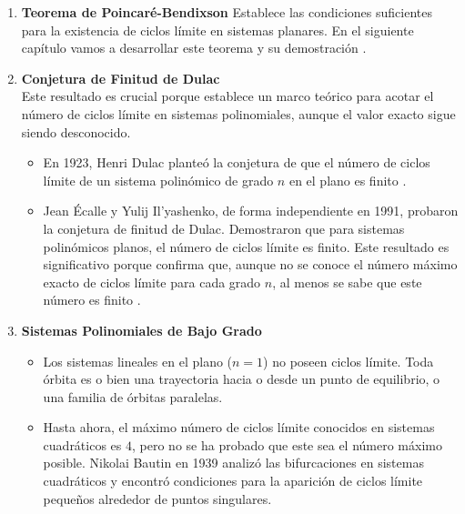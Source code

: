 \begin{enumerate}
	\item \textbf{Teorema de Poincaré-Bendixson} Establece las condiciones suficientes para la existencia de ciclos límite en sistemas planares. En el siguiente capítulo vamos a desarrollar este teorema y su demostración \cite{perko2001differential}.
	
	\item \textbf{Conjetura de Finitud de Dulac}\\

	Este resultado es crucial porque establece un marco teórico para acotar el número de ciclos límite en sistemas polinomiales, aunque el valor exacto sigue siendo desconocido.
	\begin{itemize}
		\item En 1923, Henri Dulac planteó la conjetura de que el número de ciclos límite de un sistema polinómico de grado $n$ en el plano es finito \cite{dulac1923cycles}.
		\item Jean Écalle y Yulij Il'yashenko, de forma independiente en 1991, probaron la conjetura de finitud de Dulac. Demostraron que para sistemas polinómicos planos, el número de ciclos límite es finito. Este resultado es significativo porque confirma que, aunque no se conoce el número máximo exacto de ciclos límite para cada grado $n$, al menos se sabe que este número es finito \cite{ecalle1992correction, ilyashenko1991finiteness}.
	\end{itemize}

	\item \textbf{Sistemas Polinomiales de Bajo Grado}
	\begin{itemize}
		\item Los sistemas lineales en el plano ($n=1$) no poseen ciclos límite. Toda órbita es o bien una trayectoria hacia o desde un punto de equilibrio, o una familia de órbitas paralelas.

		\item Hasta ahora, el máximo número de ciclos límite conocidos en sistemas cuadráticos es $4$, pero no se ha probado que este sea el número máximo posible. Nikolai Bautin en 1939 analizó las bifurcaciones en sistemas cuadráticos y encontró condiciones para la aparición de ciclos límite pequeños alrededor de puntos singulares.
	\end{itemize}


\end{enumerate}
